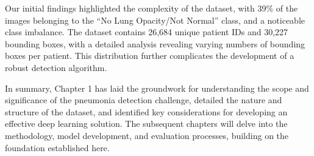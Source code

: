 Our initial findings highlighted the complexity of the dataset, with 39\% of the images belonging to the “No Lung Opacity/Not Normal” class, and a noticeable class imbalance. The dataset contains 26,684 unique patient IDs and 30,227 bounding boxes, with a detailed analysis revealing varying numbers of bounding boxes per patient. This distribution further complicates the development of a robust detection algorithm.

In summary, Chapter 1 has laid the groundwork for understanding the scope and significance of the pneumonia detection challenge, detailed the nature and structure of the dataset, and identified key considerations for developing an effective deep learning solution. The subsequent chapters will delve into the methodology, model development, and evaluation processes, building on the foundation established here.
